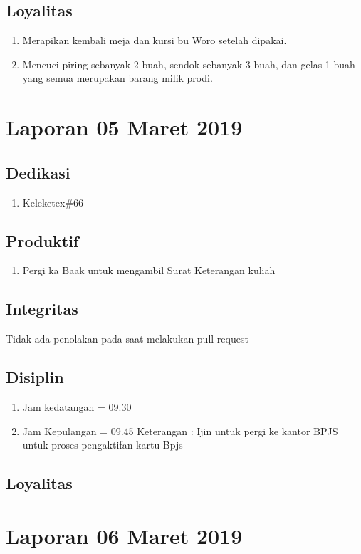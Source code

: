 \subsection{Loyalitas}
\begin{enumerate}
\item Merapikan kembali meja dan kursi bu Woro setelah dipakai. 
\item Mencuci piring sebanyak 2 buah, sendok sebanyak 3 buah, dan gelas 1 buah yang semua merupakan barang milik prodi.
\end{enumerate}

\section{Laporan 05 Maret 2019}
\subsection{Dedikasi}
\begin{enumerate}
\item Keleketex\#66
\end{enumerate}
\subsection{Produktif}
\begin{enumerate}
\item Pergi ka Baak untuk mengambil Surat Keterangan kuliah
\end{enumerate}
\subsection{Integritas}
Tidak ada penolakan pada saat melakukan pull request
\subsection{Disiplin}
\begin{enumerate}
\item Jam kedatangan = 09.30
\item Jam Kepulangan = 09.45
Keterangan : Ijin untuk pergi ke kantor BPJS untuk proses pengaktifan kartu Bpjs
\end{enumerate}
\subsection{Loyalitas}

\section{Laporan 06 Maret 2019}

